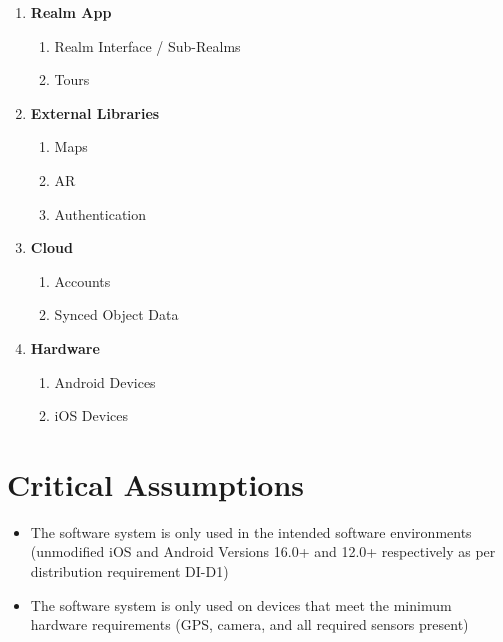 \documentclass{article}
\begin{document}
\begin{enumerate}[label=\textbf{\arabic*.}]
    \item \textbf{Realm App}
    \begin{enumerate}
        \item Realm Interface / Sub-Realms
        \item Tours
    \end{enumerate}
    \item \textbf{External Libraries}
    \begin{enumerate}
        \item Maps
        \item AR
        \item Authentication
    \end{enumerate}
    \item \textbf{Cloud}
    \begin{enumerate}
        \item Accounts
        \item Synced Object Data
    \end{enumerate}
    \item \textbf{Hardware}
    \begin{enumerate}
        \item Android Devices
        \item iOS Devices
    \end{enumerate}
\end{enumerate}

\section{Critical Assumptions}


\begin{itemize}
    \item The software system is only used in the intended software environments (unmodified iOS and Android Versions 16.0+ and 12.0+ respectively as per distribution requirement DI-D1)
    \item The software system is only used on devices that meet the minimum hardware requirements (GPS, camera, and all required sensors present)
\end{itemize}
\end{document}
